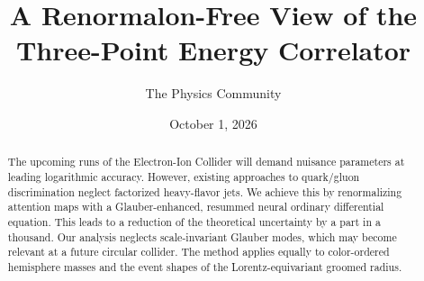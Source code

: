 \documentclass[11pt]{article}
\title{A Renormalon-Free View of the Three-Point Energy Correlator}
\author{The Physics Community}
\date{October 1, 2026}
\numberwithin{equation}{section}
\theoremstyle{definition}
\theoremstyle{remark}
\begin{document}
\maketitle
\begin{abstract}
The upcoming runs of the Electron-Ion Collider will demand nuisance
parameters at leading logarithmic accuracy. However, existing approaches
to quark/gluon discrimination neglect factorized heavy-flavor jets. We
achieve this by renormalizing attention maps with a Glauber-enhanced,
resummed neural ordinary differential equation. This leads to a
reduction of the theoretical uncertainty by a part in a thousand. Our
analysis neglects scale-invariant Glauber modes, which may become
relevant at a future circular collider. The method applies equally to
color-ordered hemisphere masses and the event shapes of the
Lorentz-equivariant groomed radius.
\end{abstract}
\tableofcontents





\nocite{*}


\end{document}
